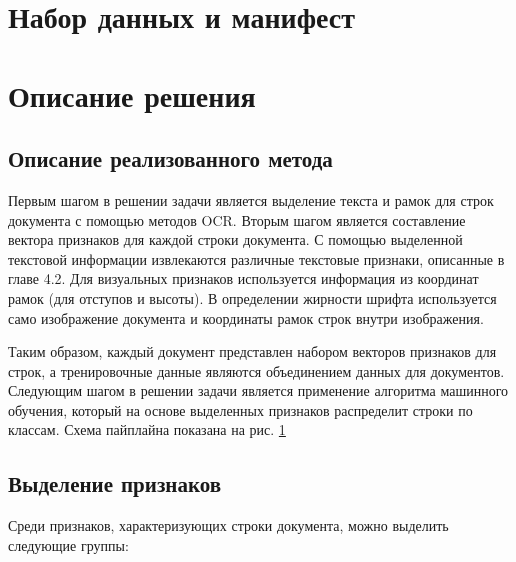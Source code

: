\documentclass{ProcISPRAS}
\begin{document}
\section{Набор данных и манифест}



\section{Описание решения}

\subsection{Описание реализованного метода}

Первым шагом в решении задачи является выделение текста и рамок для строк документа с помощью методов OCR. Вторым шагом является составление вектора признаков для каждой строки документа. С помощью выделенной текстовой информации извлекаются различные текстовые признаки, описанные в главе 4.2. Для визуальных признаков используется информация из координат рамок (для отступов и высоты). В определении жирности шрифта используется само изображение документа и координаты рамок строк внутри изображения.

Таким образом, каждый документ представлен набором векторов признаков для строк, а тренировочные данные являются объединением данных для документов.
Следующим шагом в решении задачи является применение алгоритма машинного обучения, который на основе выделенных признаков распределит строки по классам. Схема пайплайна показана на рис. \ref{fig:pipeline}

\begin{figure}[ht]
    \label{fig:pipeline}
\end{figure}

\subsection{Выделение признаков}

Среди признаков, характеризующих строки документа, можно выделить следующие группы:
\end{document}
